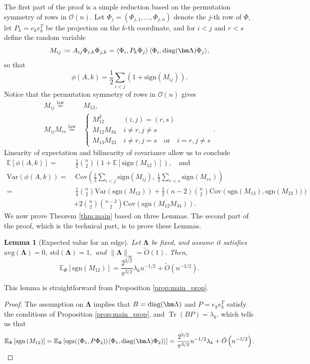 \documentclass[reqno]{amsart}
\numberwithin{equation}{section}
\newcommand\E{\mathbb{E}}
\newcommand\rem{\tilde{O}\left(n^{-3/2}\right)}
\newcommand\Tr{{\operatorname{Tr}}}
\newcommand{\diag}{\mathop {\rm diag}}
\newcommand{\av}{\mathrm{avg}}
\newcommand{\std}{\mathrm{std}}
\newcommand{\Var}{\mathrm{Var}}
\newcommand{\Cov}{\mathrm{Cov}}
\newtheorem{lemma}[theorem]{Lemma}
\begin{document}
The first part of the proof is a simple reduction based on the permutation symmetry of rows in $\mathcal{O}(n)$. Let $\Phi_{j}=(\Phi_{j,1},\ldots,\Phi_{j,n})$ denote the $j$-th row of $\Phi$, let $P_{k}=e_{k}e_{k}^{T}$ be the projection on the $k$-th coordinate, and for $i<j$ and $r<s$ define the random variable
\[M_{ij}:=A_{ij}\Phi_{i,k}\Phi_{j,k}=\langle\Phi_i,P_{k}\Phi_{j}\rangle\,\langle\Phi_{i},\diag(\bm\Lambda)\Phi_j\rangle,\]
so that
\[\phi(A,k)=\frac{1}{2}\sum_{i<j}(1+\mathrm{sign}(M_{ij})).\]
Notice that the permutation symmetry of rows in $\mathcal{O}(n)$ gives  
\begin{align*}
     M_{ij}\stackrel{\mathrm{law}}{=} & M_{12},\\
     M_{ij}M_{rs}\stackrel{\mathrm{law}}{=} & \begin{cases}M_{12}^2 &\ (i,j)=(r,s)\\
     M_{12}M_{34} &\ i\ne r,j\ne s\\
     M_{13}M_{23} &\ i\ne r,j= s\quad  \text{or}\quad i= r,j\ne s\end{cases}.
\end{align*}
Linearity of expectation and bilinearity of covariance allow us to conclude
\begin{align*}
    \E[\phi(A,k)]= &\ \frac{1}{2}{n \choose 2}\left(1+\E[\mathrm{sign}(M_{12})]\right),\quad\text{and}\\
    \Var(\phi(A,k))= &\ \Cov\left(\frac{1}{2}\sum_{i<j}\mathrm{sign}(M_{ij}),\ \frac{1}{2}\sum_{r<s}\mathrm{sign}(M_{rs})\right)\\
    = &\  \frac{1}{4} {n \choose 2} \Var( \mathrm{sgn}\left(M_{12} \right))+ \frac{1}{2} (n-2) {n \choose 2} \Cov\left( \mathrm{sgn}(M_{13}),\mathrm{sgn}(M_{23}))\right)\\
    & +2 {n \choose 2} {n-2 \choose 2}\Cov(\mathrm{sgn}\left(M_{12} M_{34} \right)).
\end{align*}
We now prove Theorem \ref{thm:main} based on three Lemmas. The second part of the proof, which is the technical part, is to prove these Lemmas. 
\begin{lemma}[Expected value for an edge]\label{lm:expectedvalue} Let $\bm\Lambda$ be fixed, and assume it satisfies $\av(\bm\Lambda)=0$, $\std(\bm\Lambda)=1,$ and $\|\bm\Lambda\|_{\infty}=\tilde{O}(1)$. Then, 
$$ \E_{\Phi}\left[ \mathrm{sgn}\left(M_{12} \right)\right] = \frac{2^{3/2}}{\pi^{3/2}}\lambda_{k}n^{-1/2}+\rem.$$
\end{lemma}
This lemma is straightforward from Proposition \ref{prop:main_prop}.
\begin{proof}
    The assumption on $\bm\Lambda$ implies that $B=\diag(\bm\Lambda)$ and $P=e_{k}e_{k}^{T}$ satisfy the conditions of Proposition \ref{prop:main_prop}, and $\Tr(BP)=\lambda_{k}$. which tells us that
    $$\E_{\Phi}\left[ \mathrm{sgn}\left(M_{12} \right)\right]=\E_{\Phi}\left[ \mathrm{sgn}(\langle\Phi_{1},P\Phi_2)\rangle\langle\Phi_{1},\diag(\bm\Lambda)\Phi_2)\rangle\right]=\frac{2^{3/2}}{\pi^{3/2}}n^{-1/2}\lambda_k+\rem.$$
\end{proof}
\end{document}
